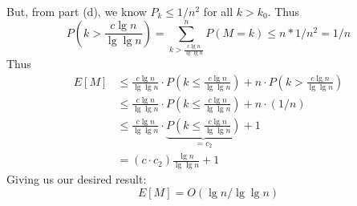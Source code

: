 \documentclass[paper=a4, fontsize=11pt]{scrartcl} %
\numberwithin{equation}{section} %
\numberwithin{figure}{section} %
\numberwithin{table}{section} %
\begin{document}
But, from part (d), we know $P_k \leq 1/n^2$ for all $k > k_0$. Thus 
\[P\left(k > \frac{c \lg n}{\lg \lg n}\right) = \sum_{k > \frac{c \lg n}{\lg \lg n}}^n P(M = k) \leq n * 1/n^2 = 1/n\]
Thus
\begin{align*}
E[M] &\leq  \frac{c \lg n}{\lg \lg n} \cdot P\left(k \leq \frac{c \lg n}{\lg \lg n}\right) + n \cdot P\left(k > \frac{c \lg n}{\lg \lg n}\right) \\
	&\leq \frac{c \lg n}{\lg \lg n} \cdot P\left(k \leq \frac{c \lg n}{\lg \lg n}\right) + n \cdot (1/n) \\ 
	&\leq \frac{c \lg n}{\lg \lg n} \cdot \underbrace{P\left(k \leq \frac{c \lg n}{\lg \lg n}\right)}_{= c_2} + 1 \\
	&= (c\cdot c_2) \frac{\lg n}{\lg \lg n} + 1
\end{align*}
Giving us our desired result:
\[E[M] = O(\lg n / \lg \lg n)\]
\end{document}
